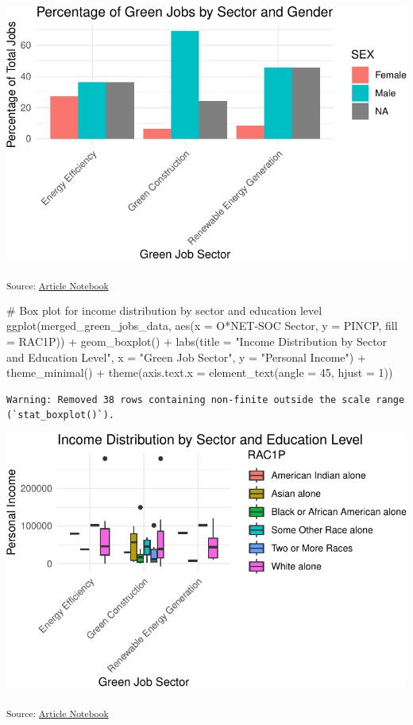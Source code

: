 \documentclass[
  letterpaper,
  DIV=11,
  numbers=noendperiod]{scrartcl}
\newenvironment{Shaded}{\begin{snugshade}}{\end{snugshade}}
\newcommand{\AttributeTok}[1]{\textcolor[rgb]{0.40,0.45,0.13}{#1}}
\newcommand{\CommentTok}[1]{\textcolor[rgb]{0.37,0.37,0.37}{#1}}
\newcommand{\DecValTok}[1]{\textcolor[rgb]{0.68,0.00,0.00}{#1}}
\newcommand{\FunctionTok}[1]{\textcolor[rgb]{0.28,0.35,0.67}{#1}}
\newcommand{\NormalTok}[1]{\textcolor[rgb]{0.00,0.23,0.31}{#1}}
\newcommand{\SpecialCharTok}[1]{\textcolor[rgb]{0.37,0.37,0.37}{#1}}
\newcommand{\StringTok}[1]{\textcolor[rgb]{0.13,0.47,0.30}{#1}}
\begin{document}
\includegraphics{index_files/figure-pdf/unnamed-chunk-47-2.pdf}

\textsubscript{Source:
\href{https://beeckcenter.github.io/climate-equity-workforce/index-preview.html}{Article
Notebook}}

\begin{Shaded}
\begin{Highlighting}[]
\CommentTok{\# Box plot for income distribution by sector and education level}
\FunctionTok{ggplot}\NormalTok{(merged\_green\_jobs\_data, }\FunctionTok{aes}\NormalTok{(}\AttributeTok{x =} \StringTok{\textasciigrave{}}\AttributeTok{O*NET{-}SOC Sector}\StringTok{\textasciigrave{}}\NormalTok{, }\AttributeTok{y =}\NormalTok{ PINCP, }\AttributeTok{fill =}\NormalTok{ RAC1P)) }\SpecialCharTok{+}
  \FunctionTok{geom\_boxplot}\NormalTok{() }\SpecialCharTok{+}
  \FunctionTok{labs}\NormalTok{(}\AttributeTok{title =} \StringTok{"Income Distribution by Sector and Education Level"}\NormalTok{,}
       \AttributeTok{x =} \StringTok{"Green Job Sector"}\NormalTok{, }\AttributeTok{y =} \StringTok{"Personal Income"}\NormalTok{) }\SpecialCharTok{+}
  \FunctionTok{theme\_minimal}\NormalTok{() }\SpecialCharTok{+}
  \FunctionTok{theme}\NormalTok{(}\AttributeTok{axis.text.x =} \FunctionTok{element\_text}\NormalTok{(}\AttributeTok{angle =} \DecValTok{45}\NormalTok{, }\AttributeTok{hjust =} \DecValTok{1}\NormalTok{))}
\end{Highlighting}
\end{Shaded}

\begin{verbatim}
Warning: Removed 38 rows containing non-finite outside the scale range
(`stat_boxplot()`).
\end{verbatim}

\includegraphics{index_files/figure-pdf/unnamed-chunk-48-1.pdf}

\textsubscript{Source:
\href{https://beeckcenter.github.io/climate-equity-workforce/index-preview.html}{Article
Notebook}}
\end{document}
